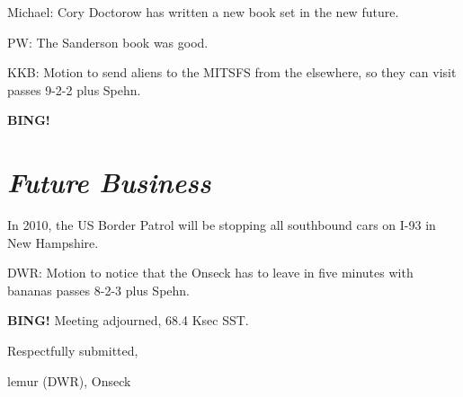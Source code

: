 \documentclass[10pt]{article}
\newcommand{\bing}{{\bf BING!} }
\newcommand{\goto}[1]{\bing \vskip 12pt \section*{{\em{#1}}}}
\newcommand{\ps}{ plus Spehn\xspace}
\newcommand{\onseck}{lemur (DWR), Onseck}
\begin{document}
Michael: Cory Doctorow has written a new book set in the new
future.

PW: The Sanderson book was good.

KKB: Motion to send aliens to the MITSFS from the elsewhere, so
they can visit passes 9-2-2\ps.

\goto{Future Business}

In 2010, the US Border Patrol will be stopping all southbound cars on
I-93 in New Hampshire.

DWR: Motion to notice that the Onseck has to leave in five minutes
with bananas passes 8-2-3\ps.

\bing
\noindent
Meeting adjourned, 68.4 Ksec SST.

\vspace{18pt}

\centerline{Respectfully submitted,}
\centerline{\onseck}
\end{document}
